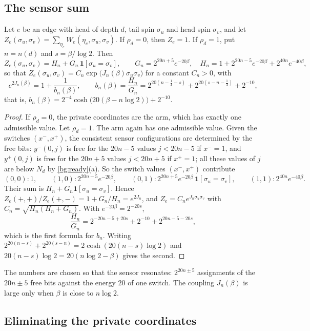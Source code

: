 \subsection{The sensor sum}

\begin{lemma}\label{pay:sum}
Let $e$ be an edge with head of depth $d$, tail spin $\sigma_u$ and head spin $\sigma_v$, and let $Z_e(\sigma_u,\sigma_v)=\sum_{\eta_e}W_e(\eta_e,\sigma_u,\sigma_v)$. If $\rho_d=0$, then $Z_e=1$. If $\rho_d=1$, put $n=n(d)$ and $s=\beta/\log2$. Then
\[
Z_e(\sigma_u,\sigma_v)=H_n+G_n\,\mathbf 1[\sigma_u=\sigma_v],\qquad G_n=2^{20n+5}e^{-20\beta},\quad H_n=1+2^{20n-5}e^{-20\beta}+2^{40n}e^{-40\beta},
\]
so that $Z_e(\sigma_u,\sigma_v)=C_n\exp\bigl(J_n(\beta)\sigma_u\sigma_v\bigr)$ for a constant $C_n>0$, with
\[
e^{2J_n(\beta)}=1+\frac1{b_n(\beta)},\qquad b_n(\beta)=\frac{H_n}{G_n}=2^{20(n-\frac14-s)}+2^{20(s-n-\frac14)}+2^{-10},
\]
that is, $b_n(\beta)=2^{-4}\cosh\bigl(20(\beta-n\log2)\bigr)+2^{-10}$.
\end{lemma}

\begin{proof}
If $\rho_d=0$, the private coordinates are the arm, which has exactly one admissible value. Let $\rho_d=1$. The arm again has one admissible value. Given the switches $(x^-,x^+)$, the consistent sensor configurations are determined by the free bits: $y^-(0,j)$ is free for the $20n-5$ values $j<20n-5$ if $x^-=1$, and $y^+(0,j)$ is free for the $20n+5$ values $j<20n+5$ if $x^+=1$; all these values of $j$ are below $N_d$ by \cref{bg:ready}(a). So the switch values $(x^-,x^+)$ contribute
\[
(0,0)\colon 1,\qquad(1,0)\colon2^{20n-5}e^{-20\beta},\qquad(0,1)\colon2^{20n+5}e^{-20\beta}\,\mathbf 1[\sigma_u=\sigma_v],\qquad(1,1)\colon2^{40n}e^{-40\beta}.
\]
Their sum is $H_n+G_n\mathbf 1[\sigma_u=\sigma_v]$. Hence $Z_e(+,+)/Z_e(+,-)=1+G_n/H_n=e^{2J_n}$, and $Z_e=C_ne^{J_n\sigma_u\sigma_v}$ with $C_n=\sqrt{H_n(H_n+G_n)}$. With $e^{-20\beta}=2^{-20s}$,
\[
\frac{H_n}{G_n}=2^{-20n-5+20s}+2^{-10}+2^{20n-5-20s},
\]
which is the first formula for $b_n$. Writing $2^{20(n-s)}+2^{20(s-n)}=2\cosh(20(n-s)\log2)$ and $20(n-s)\log2=20(n\log2-\beta)$ gives the second.
\end{proof}

The numbers are chosen so that the sensor resonates: $2^{20n\pm5}$ assignments of the $20n\pm5$ free bits against the energy $20$ of one switch. The coupling $J_n(\beta)$ is large only when $\beta$ is close to $n\log2$.

\subsection{Eliminating the private coordinates}

